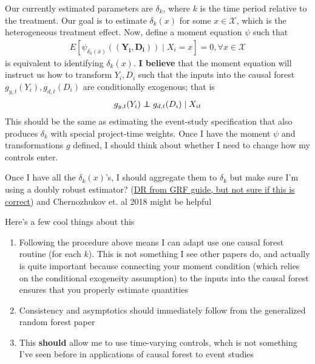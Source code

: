 \documentclass[source/paper/main.tex]{subfiles}
\begin{document}
Our currently estimated parameters are $\delta_k$, where $k$ is the time period relative to the treatment. Our goal is to estimate $\delta_k(x)$ for some $x \in \mathcal{X}$, which is the heterogeneous treatment effect. Now, define a moment equation $\psi $ such that
\begin{align}
    E[\psi_{\delta_k(x)}(( \boldsymbol{Y_i, D_i})) \mid X_i = x] = 0, \forall x \in \mathcal{X} 
\end{align}
is equivalent to identifying $\delta_k(x)$. \textbf{I believe} that the moment equation will instruct us how to transform \textbf{$Y_i, D_i$} such that the inputs into the causal forest $g_{y,t}(Y_i), g_{d,t}(D_i)$ are conditionally exogenous; that is
\begin{align}
    g_{y,t}(Y_i) \independent g_{d,t}(D_i) \mid X_{it} 
\end{align}
This should be the same as estimating the event-study specification that also produces $\delta_k$ with special project-time weights. Once I have the moment $\psi$ and transformations $g$ defined, I should think about whether I need to change how my controls enter. 

Once I have all the $\delta_k(x)$'s, I should aggregate them to $\delta_k$ but make sure I'm using a doubly robust estimator? (\href{https://grf-labs.github.io/grf/reference/get_scores.causal_forest.html}{DR from GRF guide, but not sure if this is correct}) and Chernozhukov et. al 2018 might be helpful

Here's a few cool things about this
\begin{enumerate}
    \item Following the procedure above means I can adapt use one causal forest routine (for each $k$). This is not something I see other papers do, and actually is quite important because connecting your moment condition (which relies on the conditional exogeneity assumption) to the inputs into the causal forest ensures that you properly estimate quantities
    \item Consistency and asymptotics should immediately follow from the generalized random forest paper
    \item This \textbf{should} allow me to use time-varying controls, whch is not something I've seen before in applications of causal forest to event studies
\end{enumerate}
\end{document}
